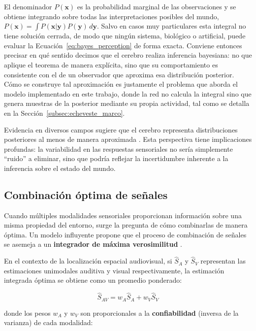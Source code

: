 El denominador $P(\mathbf{x})$ es la probabilidad marginal de las observaciones y se obtiene integrando sobre todas las interpretaciones posibles del mundo, $P(\mathbf{x}) = \int P(\mathbf{x}|\mathbf{y})P(\mathbf{y})\, d\mathbf{y}$. Salvo en casos muy particulares esta integral no tiene solución cerrada, de modo que ningún sistema, biológico o artificial, puede evaluar la Ecuación~\ref{eq:bayes_perception} de forma exacta. Conviene entonces precisar en qué sentido decimos que el cerebro realiza inferencia bayesiana: no que aplique el teorema de manera explícita, sino que su comportamiento es consistente con el de un observador que aproxima esa distribución posterior. Cómo se construye tal aproximación es justamente el problema que aborda el modelo implementado en este trabajo, donde la red no calcula la integral sino que genera muestras de la posterior mediante su propia actividad, tal como se detalla en la Sección~\ref{subsec:echeveste_marco}.

Evidencia en diversos campos sugiere que el cerebro representa distribuciones posteriores al menos de manera aproximada \citep{echeveste2020cortical}. Esta perspectiva tiene implicaciones profundas: la variabilidad en las respuestas sensoriales no sería simplemente ``ruido'' a eliminar, sino que podría reflejar la incertidumbre inherente a la inferencia sobre el estado del mundo.

\subsection{Combinación óptima de señales}
\label{subsec:combinacion_optima}

Cuando múltiples modalidades sensoriales proporcionan información sobre una misma propiedad del entorno, surge la pregunta de cómo combinarlas de manera óptima. Un modelo influyente propone que el proceso de combinación de señales se asemeja a un \textbf{integrador de máxima verosimilitud} \citep{alais2004ventriloquist}.

En el contexto de la localización espacial audiovisual, si $\hat{S}_A$ y $\hat{S}_V$ representan las estimaciones unimodales auditiva y visual respectivamente, la estimación integrada óptima se obtiene como un promedio ponderado:

\begin{equation}
\hat{S}_{AV} = w_A \hat{S}_A + w_V \hat{S}_V
\label{eq:mle_integration}
\end{equation}

donde los pesos $w_A$ y $w_V$ son proporcionales a la \textbf{confiabilidad} (inversa de la varianza) de cada modalidad:

